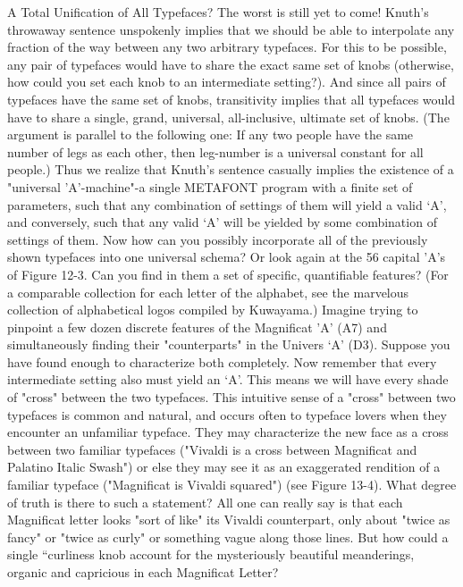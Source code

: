                       A Total Unification of All Typefaces?
        The worst is still yet to come! Knuth's throwaway sentence unspokenly implies
that we should be able to interpolate any fraction of the way between any two arbitrary
typefaces. For this to be possible, any pair of typefaces would have to share the exact
same set of knobs (otherwise, how could you set each knob to an intermediate setting?).
And since all pairs of typefaces have the same set of knobs, transitivity implies that all
typefaces would have to share a single, grand, universal, all-inclusive, ultimate set of
knobs. (The argument is parallel to the following one: If any two people have the same
number of legs as each other, then leg-number is a universal constant for all people.)
        Thus we realize that Knuth's sentence casually implies the existence of a
"universal 'A'-machine"-a single METAFONT program with a finite set of parameters,
such that any combination of settings of them will yield a valid `A', and conversely, such
that any valid `A' will be yielded by some combination of settings of them. Now how can
you possibly incorporate all of the previously shown typefaces into one universal
schema?
        Or look again at the 56 capital 'A's of Figure 12-3. Can you find in them a set of
specific, quantifiable features? (For a comparable collection for each letter of the
alphabet, see the marvelous collection of alphabetical logos compiled by Kuwayama.)
Imagine trying to pinpoint a few dozen discrete features of the Magnificat 'A' (A7) and
simultaneously finding their "counterparts" in the Univers `A' (D3). Suppose you have
found enough to characterize both completely. Now remember that every intermediate
setting also must yield an `A'. This means we will have every shade of "cross" between
the two typefaces.
        This intuitive sense of a "cross" between two typefaces is common and natural,
and occurs often to typeface lovers when they encounter an unfamiliar typeface. They
may characterize the new face as a cross between two familiar typefaces ("Vivaldi is a
cross between Magnificat and Palatino Italic Swash") or else they may see it as an
exaggerated rendition of a familiar typeface ("Magnificat is Vivaldi squared") (see Figure
13-4). What degree of truth is there to such a statement? All one can really say is that
each Magnificat letter looks "sort of like" its Vivaldi counterpart, only about "twice as
fancy" or "twice as curly" or something vague along those lines. But how could a single
“curliness knob account for the mysteriously beautiful meanderings, organic and
capricious in each Magnificat Letter?




